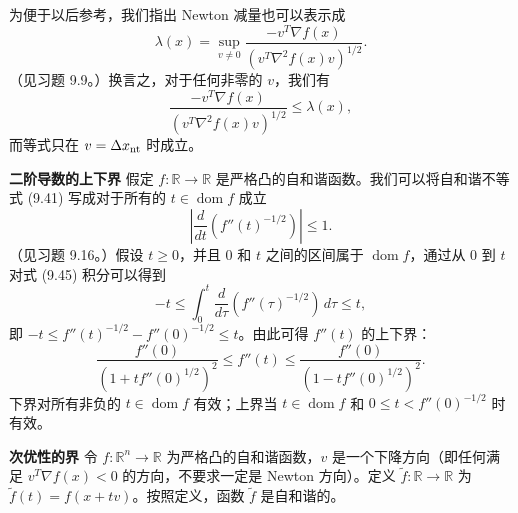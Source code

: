 \documentclass[UTF8,12pt,a4paper,fontset=fandol]{ctexart}
\begin{document}
为便于以后参考，我们指出 Newton 减量也可以表示成
\[
\lambda(x)=\sup_{v\neq0}\frac{-v^T\nabla f(x)}{(v^T\nabla^2 f(x)v)^{1/2}}.
\]
（见习题 9.9。）换言之，对于任何非零的 $v$，我们有
\begin{equation}
\frac{-v^T\nabla f(x)}{(v^T\nabla^2 f(x)v)^{1/2}}\leq\lambda(x),
\tag{9.44}
\end{equation}
而等式只在 $v=\Delta x_{\rm nt}$ 时成立。

\noindent\textbf{二阶导数的上下界}\quad
假定 $f:\mathbb{R}\to\mathbb{R}$ 是严格凸的自和谐函数。我们可以将自和谐不等式 (9.41) 写成对于所有的 $t\in\operatorname{dom} f$ 成立
\begin{equation}
\left|\frac{d}{dt}\left(f''(t)^{-1/2}\right)\right|\leq1.
\tag{9.45}
\end{equation}
（见习题 9.16。）假设 $t\geq0$，并且 $0$ 和 $t$ 之间的区间属于 $\operatorname{dom} f$，通过从 $0$ 到 $t$ 对式 (9.45) 积分可以得到
\[
-t\leq \int_0^t\frac{d}{d\tau}\left(f''(\tau)^{-1/2}\right)\,d\tau\leq t,
\]
即 $-t\leq f''(t)^{-1/2}-f''(0)^{-1/2}\leq t$。由此可得 $f''(t)$ 的上下界：
\begin{equation}
\frac{f''(0)}{(1+tf''(0)^{1/2})^2}\leq f''(t)\leq
\frac{f''(0)}{(1-tf''(0)^{1/2})^2}.
\tag{9.46}
\end{equation}
下界对所有非负的 $t\in\operatorname{dom} f$ 有效；上界当 $t\in\operatorname{dom} f$ 和 $0\leq t<f''(0)^{-1/2}$ 时有效。

\noindent\textbf{次优性的界}\quad
令 $f:\mathbb{R}^n\to\mathbb{R}$ 为严格凸的自和谐函数，$v$ 是一个下降方向（即任何满足 $v^T\nabla f(x)<0$ 的方向，不要求一定是 Newton 方向）。定义 $\tilde{f}:\mathbb{R}\to\mathbb{R}$ 为 $\tilde{f}(t)=f(x+tv)$。按照定义，函数 $\tilde{f}$ 是自和谐的。
\end{document}

